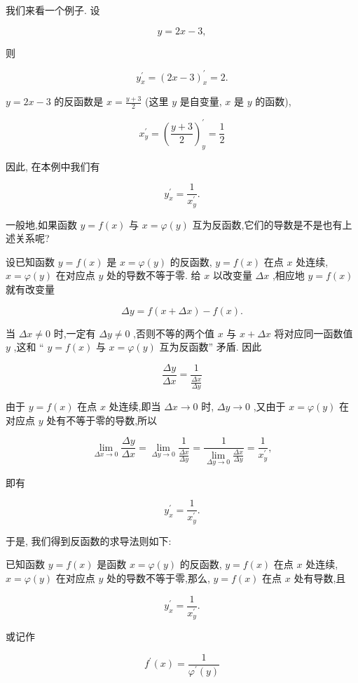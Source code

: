 \documentclass[lang=cn,newtx,10pt,scheme=chinese]{elegantbook}
\begin{document}
我们来看一个例子. 设

\[
y = {2x} - 3,
\]

则

\[
{y}_{x}^{\prime } = {\left( 2x - 3\right) }_{x}^{\prime } = 2.
\]

\(y = {2x} - 3\) 的反函数是 \(x = \frac{y + 3}{2}\) (这里 \(y\) 是自变量, \(x\) 是 \(y\) 的函数),

\[
{x}_{y}^{\prime } = {\left( \frac{y + 3}{2}\right) }_{y}^{\prime } = \frac{1}{2}
\]

因此, 在本例中我们有

\[
{y}_{x}^{\prime } = \frac{1}{{x}_{y}^{\prime }}.
\]

一般地,如果函数 \(y = f\left( x\right)\) 与 \(x = \varphi \left( y\right)\) 互为反函数,它们的导数是不是也有上述关系呢?

设已知函数 \(y = f\left( x\right)\) 是 \(x = \varphi \left( y\right)\) 的反函数, \(y = f\left( x\right)\) 在点 \(x\) 处连续, \(x = \varphi \left( y\right)\) 在对应点 \(y\) 处的导数不等于零. 给 \(x\) 以改变量 \({\Delta x}\) ,相应地 \(y = f\left( x\right)\) 就有改变量

\[
{\Delta y} = f\left( {x + {\Delta x}}\right) - f\left( x\right) .
\]

当 \({\Delta x} \neq 0\) 时,一定有 \({\Delta y} \neq 0\) ,否则不等的两个值 \(x\) 与 \(x + {\Delta x}\) 将对应同一函数值 \(y\) ,这和 “ \(y = f\left( x\right)\) 与 \(x = \varphi \left( y\right)\) 互为反函数” 矛盾. 因此

\[
\frac{\Delta y}{\Delta x} = \frac{1}{\frac{\Delta x}{\Delta y}}
\]

由于 \(y = f\left( x\right)\) 在点 \(x\) 处连续,即当 \({\Delta x} \rightarrow 0\) 时, \({\Delta y} \rightarrow 0\) ,又由于 \(x = \varphi \left( y\right)\) 在对应点 \(y\) 处有不等于零的导数,所以

\[
\mathop{\lim }\limits_{{{\Delta x} \rightarrow 0}}\frac{\Delta y}{\Delta x} = \mathop{\lim }\limits_{{{\Delta y} \rightarrow 0}}\frac{1}{\frac{\Delta x}{\Delta y}} = \frac{1}{\mathop{\lim }\limits_{{{\Delta y} \rightarrow 0}}\frac{\Delta x}{\Delta y}} = \frac{1}{{x}_{y}^{\prime }},
\]

即有

\[
{y}_{x}^{\prime } = \frac{1}{{x}_{y}^{\prime }}.
\]

于是, 我们得到反函数的求导法则如下:

\begin{proposition}[反函数的求导法则]

已知函数 \(y = f\left( x\right)\) 是函数 \(x = \varphi \left( y\right)\) 的反函数, \(y = f\left( x\right)\) 在点 \(x\) 处连续, \(x = \varphi \left( y\right)\) 在对应点 \(y\) 处的导数不等于零,那么, \(y = f\left( x\right)\) 在点 \(x\) 处有导数,且

\[
{y}_{x}^{\prime } = \frac{1}{{x}_{y}^{\prime }}\text{.}
\]

或记作

\[
{f}^{\prime }\left( x\right) = \frac{1}{{\varphi }^{\prime }\left( y\right) }
\]

\end{proposition}
\end{document}
